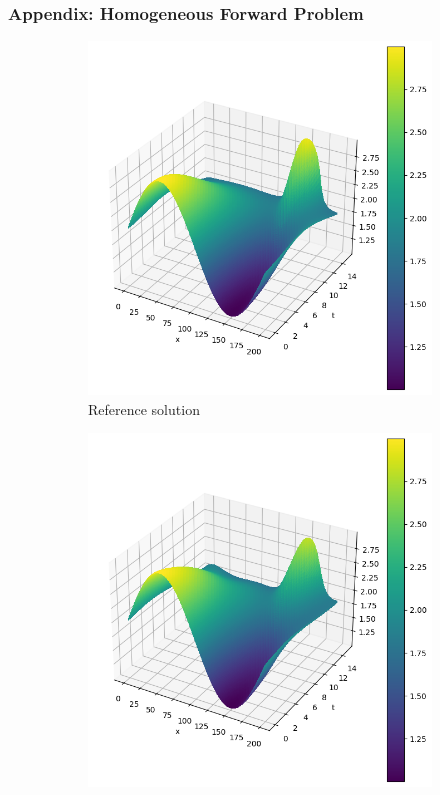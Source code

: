 \begin{frame}
    \frametitle{Appendix: Homogeneous Forward Problem}

    \begin{figure}
        \centering
        \begin{subfigure}[b]{0.45\textwidth}
            \centering
            \includegraphics[width=\textwidth]{images/homogeneous_swe_pseudospectral_height.png}
            \caption{Reference solution}
            \label{fig:10_homogeneous_pseudospectral_swe_height}
        \end{subfigure}
        \hfill
        \begin{subfigure}[b]{0.45\textwidth}
            \centering
            \includegraphics[width=\textwidth]{images/homogeneous_swe_pinn_height.png}

\end{subfigure}
\end{figure}
\end{frame}
